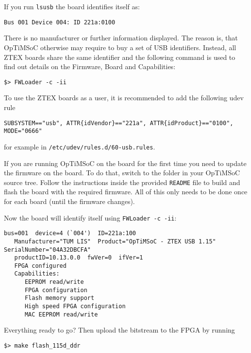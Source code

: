 If you run \verb|lsusb| the board identifies itself as:

\begin{lstlisting}
Bus 001 Device 004: ID 221a:0100
\end{lstlisting}

There is no manufacturer or further information displayed. The reason
is, that OpTiMSoC otherwise may require to buy a set of USB
identifiers. Instead, all ZTEX boards share the same identifier and
the following command is used to find out details on the Firmware,
Board and Capabilities:

\begin{lstlisting}
$> FWLoader -c -ii
\end{lstlisting}

To use the ZTEX boards as a user, it is recommended to add the following
udev rule

\begin{lstlisting}
SUBSYSTEM=="usb", ATTR{idVendor}=="221a", ATTR{idProduct}=="0100", MODE="0666"
\end{lstlisting}

for example in \verb|/etc/udev/rules.d/60-usb.rules|.

If you are running OpTiMSoC on the board for the first time you need to update
the firmware on the board. To do that, switch to the folder
 in your OpTiMSoC source tree.
Follow the instructions inside the provided \verb|README| file to build and
flash the board with the required firmware. All of this only needs to be done
once for each board (until the firmware changes).

Now the board will identify itself using \verb|FWLoader -c -ii|:

\begin{lstlisting}
bus=001  device=4 (`004')  ID=221a:100
   Manufacturer="TUM LIS"  Product="OpTiMSoC - ZTEX USB 1.15"    SerialNumber="04A32DBCFA"
   productID=10.13.0.0  fwVer=0  ifVer=1
   FPGA configured
   Capabilities:
      EEPROM read/write
      FPGA configuration
      Flash memory support
      High speed FPGA configuration
      MAC EEPROM read/write
\end{lstlisting}

Everything ready to go? Then upload the bitstream to the FPGA by running

\begin{lstlisting}
$> make flash_115d_ddr
\end{lstlisting}

